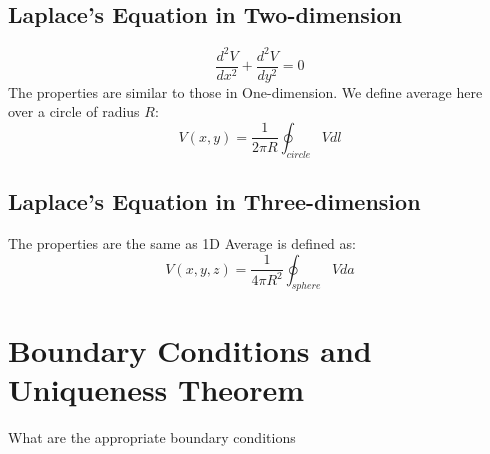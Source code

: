 \documentclass{article}
\begin{document}
\subsection{Laplace's Equation in Two-dimension}
\[ \frac{d^2 V}{dx^2} + \frac{d^2 V}{dy^2} = 0\]
The properties are similar to those in One-dimension.
We define average here over a circle of radius $R$:
\[ V(x,y) = \frac{1}{2 \pi R} \oint_{circle} V dl\]
\subsection{Laplace's Equation in Three-dimension}
The properties are the same as 1D
Average is defined as:
\[ V(x,y,z) = \frac{1}{4 \pi R^2} \oint_{sphere} V da\]

\section{Boundary Conditions and Uniqueness Theorem}
What are the appropriate boundary conditions 
\end{document}
